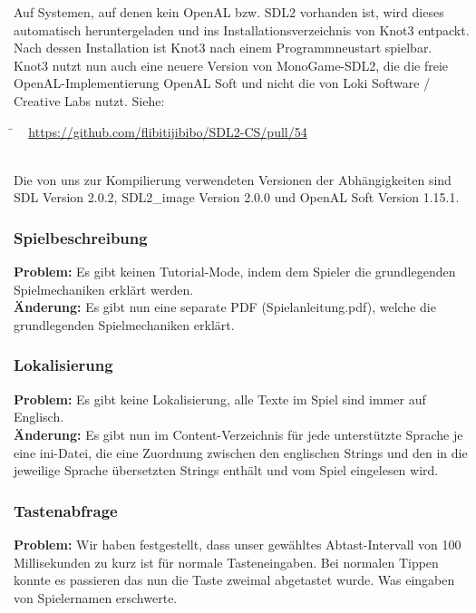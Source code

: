 Auf Systemen, auf denen kein OpenAL bzw. SDL2 vorhanden ist, wird dieses automatisch heruntergeladen und ins Installationsverzeichnis von Knot3 entpackt.
Nach dessen Installation ist Knot3 nach einem Programmneustart spielbar.\\

Knot3 nutzt nun auch eine neuere Version von MonoGame-SDL2, die die freie OpenAL-Implementierung OpenAL Soft und nicht die von Loki Software / Creative Labs nutzt. Siehe:  	
  	\begin{tabbing}
  			\= ~ \href {https://github.com/flibitijibibo/SDL2-CS/pull/54}
  					   {https://github.com/flibitijibibo/SDL2-CS/pull/54}
  					   
  	\end{tabbing} 
\\
Die von uns zur Kompilierung verwendeten Versionen der Abhängigkeiten sind SDL Version 2.0.2, SDL2_image Version 2.0.0 und OpenAL Soft Version 1.15.1.


\subsubsection*{Spielbeschreibung}

\textbf{Problem:}
Es gibt keinen Tutorial-Mode, indem dem Spieler die grundlegenden Spielmechaniken erklärt werden.\\

\textbf{Änderung:} Es gibt nun eine separate PDF (\glqq Spielanleitung.pdf\grqq), welche die grundlegenden Spielmechaniken erklärt.\\



\subsubsection*{Lokalisierung}

\textbf{Problem:}
Es gibt keine Lokalisierung, alle Texte im Spiel sind immer auf Englisch.\\

\textbf{Änderung:} Es gibt nun im Content-Verzeichnis für jede unterstützte Sprache je eine ini-Datei, die eine Zuordnung zwischen den englischen Strings und den in die jeweilige Sprache übersetzten Strings enthält und vom Spiel eingelesen wird.\\



\subsubsection*{Tastenabfrage}
\textbf{Problem:}
Wir haben festgestellt, dass unser gewähltes Abtast-Intervall von 100 Millisekunden zu kurz ist für normale Tasteneingaben. Bei normalen Tippen konnte es passieren das nun die Taste zweimal abgetastet wurde. Was eingaben von Spielernamen erschwerte.\\

